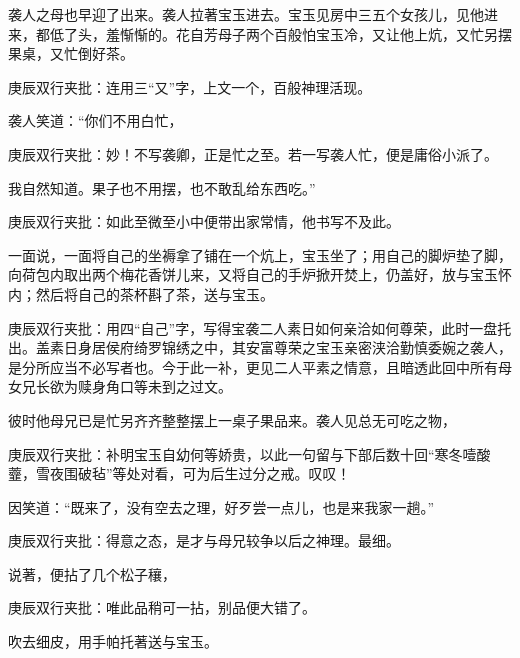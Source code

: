 \begin{parag}
    袭人之母也早迎了出来。袭人拉著宝玉进去。宝玉见房中三五个女孩儿，见他进来，都低了头，羞惭惭的。花自芳母子两个百般怕宝玉冷，又让他上炕，又忙另摆果桌，又忙倒好茶。\begin{note}庚辰双行夹批：连用三“又”字，上文一个，百般神理活现。\end{note}袭人笑道：“你们不用白忙，\begin{note}庚辰双行夹批：妙！不写袭卿，正是忙之至。若一写袭人忙，便是庸俗小派了。\end{note}我自然知道。果子也不用摆，也不敢乱给东西吃。”\begin{note}庚辰双行夹批：如此至微至小中便带出家常情，他书写不及此。\end{note}一面说，一面将自己的坐褥拿了铺在一个炕上，宝玉坐了；用自己的脚炉垫了脚，向荷包内取出两个梅花香饼儿来，又将自己的手炉掀开焚上，仍盖好，放与宝玉怀内；然后将自己的茶杯斟了茶，送与宝玉。\begin{note}庚辰双行夹批：用四“自己”字，写得宝袭二人素日如何亲洽如何尊荣，此时一盘托出。盖素日身居侯府绮罗锦绣之中，其安富尊荣之宝玉亲密浃洽勤慎委婉之袭人，是分所应当不必写者也。今于此一补，更见二人平素之情意，且暗透此回中所有母女兄长欲为赎身角口等未到之过文。\end{note}彼时他母兄已是忙另齐齐整整摆上一桌子果品来。袭人见总无可吃之物，\begin{note}庚辰双行夹批：补明宝玉自幼何等娇贵，以此一句留与下部后数十回“寒冬噎酸虀，雪夜围破毡”等处对看，可为后生过分之戒。叹叹！\end{note}因笑道：“既来了，没有空去之理，好歹尝一点儿，也是来我家一趟。”\begin{note}庚辰双行夹批：得意之态，是才与母兄较争以后之神理。最细。\end{note}说著，便拈了几个松子穰，\begin{note}庚辰双行夹批：唯此品稍可一拈，别品便大错了。\end{note}吹去细皮，用手帕托著送与宝玉。
\end{parag}


